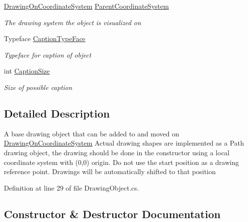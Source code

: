 \begin{DoxyCompactItemize}
\hyperlink{class_w_p_f_visualization_base_1_1_drawing_on_coordinate_system}{Drawing\+On\+Coordinate\+System} \hyperlink{class_w_p_f_visualization_base_1_1_drawing_object_add482010868cc049701792a44ec06a08}{Parent\+Coordinate\+System}
\begin{DoxyCompactList}\small\item\em The drawing system the object is visualized on \end{DoxyCompactList}\item 
Typeface \hyperlink{class_w_p_f_visualization_base_1_1_drawing_object_ad47a93196649fe058b6481afcd362952}{Caption\+Type\+Face}
\begin{DoxyCompactList}\small\item\em Typeface for caption of object \end{DoxyCompactList}\item 
int \hyperlink{class_w_p_f_visualization_base_1_1_drawing_object_a837dbc42fb649304e386583b2c6f5bcb}{Caption\+Size}
\begin{DoxyCompactList}\small\item\em Size of possible caption \end{DoxyCompactList}\end{DoxyCompactItemize}


\subsection{Detailed Description}
A base drawing object that can be added to and moved on \hyperlink{class_w_p_f_visualization_base_1_1_drawing_on_coordinate_system}{Drawing\+On\+Coordinate\+System} Actual drawing shapes are implemented as a Path drawing object, the drawing should be done in the constructor using a local coordinate system with (0,0) origin. Do not use the start position as a drawing reference point. Drawings will be automatically shifted to that position 



Definition at line 29 of file Drawing\+Object.\+cs.



\subsection{Constructor \& Destructor Documentation}
